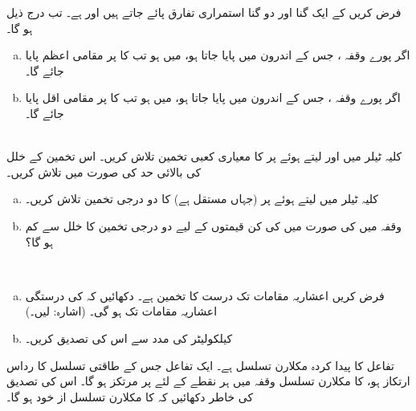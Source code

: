 فرض کریں  کے ایک گنا اور دو گنا استمراری  تفارق پائے جاتے ہیں  اور  ہے۔ تب درج ذیل ہو گا۔
\begin{enumerate}[a.]
\item
اگر  پورے  وقفہ ، جس کے  اندرون میں  پایا جاتا ہو،   میں  ہو تب  کا  پر مقامی  اعظم  پایا جائے گا۔
\item
اگر   پورے وقفہ ، جس کے  اندرون میں  پایا جاتا ہو، میں     ہو تب  کا  پر مقامی اقل  پایا جائے گا۔
\end{enumerate}
\\
کلیہ ٹیلر میں  اور  لیتے ہوئے  پر  کا  معیاری کعبی تخمین تلاش کریں۔ اس تخمین کے خلل کی بالائی حد  کی صورت میں تلاش کریں۔
\begin{enumerate}[a.]
\item
کلیہ ٹیلر میں  لیتے ہوئے  پر   (جہاں  مستقل ہے) کا دو درجی تخمین تلاش کریں۔
\item
وقفہ  میں  کی صورت میں  کی کن قیمتوں کے لیے دو درجی تخمین کا خلل  سے کم ہو گا؟ 
\end{enumerate}
\\
\begin{enumerate}[a.]
\item
فرض کریں  اعشاریہ مقامات تک   درست  کا  تخمین  ہے۔ دکھائیں کہ  کی درستگی  اعشاریہ مقامات تک  ہو گی۔ (اشارہ:  لیں۔)
\item
کیلکولیٹر کی مدد سے اس کی تصدیق کریں۔
\end{enumerate}
تفاعل  کا پیدا کردہ مکلارن تسلسل  ہے۔ ایک تفاعل جس کے طاقتی تسلسل  کا رداس ارتکاز  ہو، کا مکلارن تسلسل وقفہ   میں ہر نقطے   کے لئے   پر مرتکز ہو گا۔ اس کی تصدیق کی خاطر دکھائیں کہ  کا مکلارن تسلسل از خود  ہو گا۔ 

